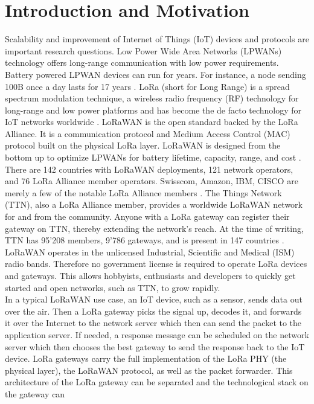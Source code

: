 \chapter{Introduction and Motivation}
\label{thesis:introduction}
Scalability and improvement of Internet of Things (IoT) devices and protocols
are important research questions.
Low Power Wide Area Networks (LPWANs) technology offers long-range communication
with low power requirements. Battery powered LPWAN devices can run for years.
For instance, a node sending 100B once a day lasts for 17 years \cite{morin}.
LoRa (short for Long Range) is a spread spectrum modulation
technique, a wireless radio frequency (RF) technology for long-range and low power platforms
and has become the de facto technology for IoT networks worldwide \cite{what_is_lora}.
LoRaWAN is the open standard backed by the LoRa Alliance. It is a communication protocol and
Medium Access Control (MAC) protocol built on the physical LoRa layer.
LoRaWAN is designed from the bottom up to optimize LPWANs
for battery lifetime, capacity, range, and cost \cite{what_is_lora_wan}.
There are 142 countries with LoRaWAN deployments, 121 network operators,
and 76 LoRa Alliance member operators. Swisscom, Amazon, IBM, CISCO are merely a few of the 
notable LoRa Alliance members \cite{lora_alliance}.
The Things Network (TTN), also a LoRa Alliance member, provides a worldwide LoRaWAN network 
for and from the community. Anyone with a LoRa gateway can register their gateway on TTN, thereby
extending the network's reach. At the time of writing, TTN has 95'208 members, 9'786 gateways, and is
present in 147 countries \cite{ttn}. LoRaWAN operates in the unlicensed Industrial, Scientific and Medical (ISM)
radio bands. Therefore no government license is required to operate LoRa devices and gateways. 
This allows hobbyists, enthusiasts and developers to quickly get started and open networks, such as TTN,
to grow rapidly.
\\
In a typical LoRaWAN use case, an IoT device, such as a sensor, sends data out over the air. Then a LoRa gateway picks
the signal up, decodes it, and forwards it over the Internet to the network server which then can send the packet to 
the application server. If needed, a response message can be scheduled on the network server which then chooses the best gateway
to send the response back to the IoT device.
LoRa gateways carry the full implementation of the LoRa PHY (the physical layer), the LoRaWAN protocol, as well as 
the packet forwarder. This architecture of the LoRa gateway can be separated and the technological stack on the gateway can 
